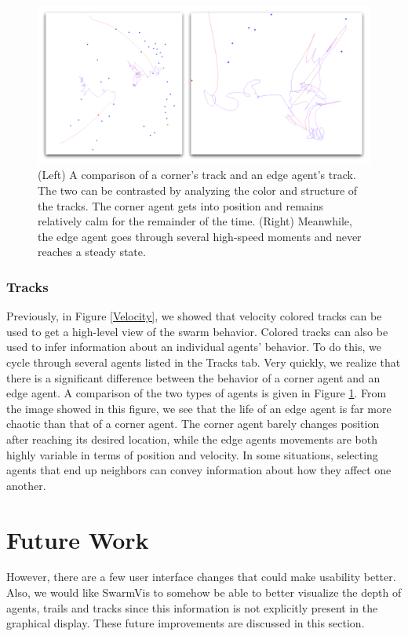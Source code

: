 \documentclass[conference]{IEEEtran}
\begin{document}
\begin{figure}
\centering
\includegraphics[scale=.3]{images/cornervsedge.pdf}
\caption{
(Left) A comparison of a corner's track and an edge agent's track.
The two can be contrasted by analyzing the color and structure of the tracks.
The corner agent gets into position and remains relatively calm for the remainder of the time.
(Right) Meanwhile, the edge agent goes through several high-speed moments and never reaches a steady state.
}
\label{CornerAndEdge}
\end{figure}

\subsubsection{Tracks}
Previously, in Figure \ref{Velocity}, we showed that velocity colored tracks can be used to get a high-level view of the swarm behavior.
Colored tracks can also be used to infer information about an individual agents' behavior.
To do this, we cycle through several agents listed in the Tracks tab.
Very quickly, we realize that there is a significant difference between the behavior of a corner agent and an edge agent.
A comparison of the two types of agents is given in Figure \ref{CornerAndEdge}.
From the image showed in this figure, we see that the life of an edge agent is far more chaotic than that of a corner agent.
The corner agent barely changes position after reaching its desired location,
while the edge agents movements are both highly variable in terms of position and velocity.
In some situations, selecting agents that end up neighbors can convey information about how they affect one another.







\section{Future Work}
However, there are a few user interface changes that could make usability better.
Also, we would like SwarmVis to somehow be able to better visualize the  depth of
agents, trails and tracks since this information is not explicitly present in the graphical display.
These future improvements are discussed in this section.
\end{document}
